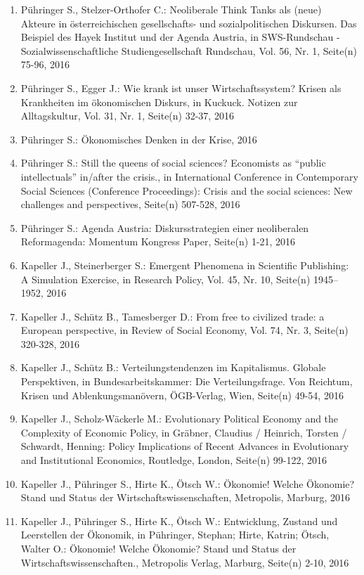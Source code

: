 \begin{enumerate}
	 \item Pühringer S., Stelzer-Orthofer C.: Neoliberale Think Tanks als (neue) Akteure in österreichischen gesellschafts- und sozialpolitischen Diskursen. Das Beispiel des Hayek Institut und der Agenda Austria, in SWS-Rundschau - Sozialwissenschaftliche Studiengesellschaft Rundschau, Vol. 56, Nr. 1, Seite(n) 75-96, 2016
	 \item Pühringer S., Egger J.: Wie krank ist unser Wirtschaftssystem? Krisen als Krankheiten im ökonomischen Diskurs, in Kuckuck. Notizen zur Alltagskultur, Vol. 31, Nr. 1, Seite(n) 32-37, 2016
	 \item Pühringer S.: Ökonomisches Denken in der Krise, 2016
	 \item Pühringer S.: Still the queens of social sciences? Economists as “public intellectuals” in/after the crisis., in International Conference in Contemporary Social Sciences (Conference Proceedings): Crisis and the social sciences: New challenges and perspectives, Seite(n) 507-528, 2016
	 \item Pühringer S.: Agenda Austria: Diskursstrategien einer neoliberalen Reformagenda: Momentum Kongress Paper, Seite(n) 1-21, 2016
	 \item Kapeller J., Steinerberger S.: Emergent Phenomena in Scientific Publishing: A Simulation Exercise, in Research Policy, Vol. 45, Nr. 10, Seite(n) 1945–1952, 2016
	 \item Kapeller J., Schütz B., Tamesberger D.: From free to civilized trade: a European perspective, in Review of Social Economy, Vol. 74, Nr. 3, Seite(n) 320-328, 2016
	 \item Kapeller J., Schütz B.: Verteilungstendenzen im Kapitalismus. Globale Perspektiven, in Bundesarbeitskammer: Die Verteilungsfrage. Von Reichtum, Krisen und Ablenkungsmanövern, ÖGB-Verlag, Wien, Seite(n) 49-54, 2016
	 \item Kapeller J., Scholz-Wäckerle M.: Evolutionary Political Economy and the Complexity of Economic Policy, in Gräbner,  Claudius / Heinrich, Torsten / Schwardt, Henning: Policy  Implications of Recent Advances in Evolutionary and Institutional  Economics, Routledge, London, Seite(n) 99-122, 2016
	 \item Kapeller J., Pühringer S., Hirte K., Ötsch W.: Ökonomie! Welche Ökonomie? Stand und Status der Wirtschaftswissenschaften, Metropolis, Marburg, 2016
	 \item Kapeller J., Pühringer S., Hirte K., Ötsch W.: Entwicklung, Zustand und Leerstellen der Ökonomik, in Pühringer, Stephan; Hirte, Katrin; Ötsch, Walter O.: Ökonomie! Welche Ökonomie? Stand und Status der Wirtschaftswissenschaften., Metropolis Verlag, Marburg, Seite(n) 2-10, 2016

\end{enumerate}
